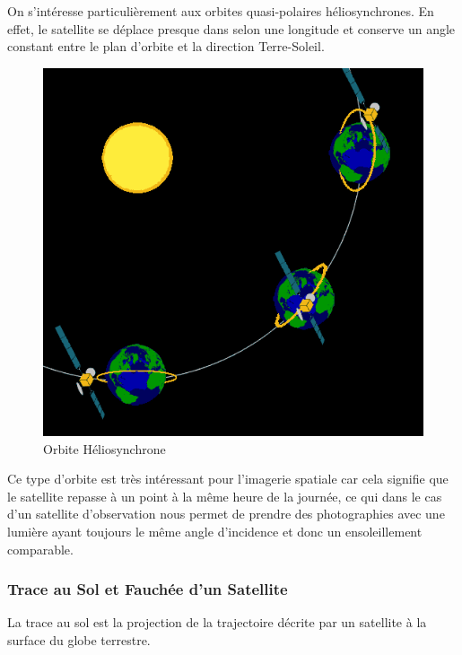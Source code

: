 \documentclass[a4paper, 10pt]{report}
\begin{document}
On s'intéresse particulièrement aux orbites quasi-polaires héliosynchrones. En effet, le satellite se déplace presque dans selon une longitude et conserve un angle constant entre le plan d'orbite et la direction Terre-Soleil.
\begin{figure}[H]
	\begin{center}
		\includegraphics[scale=0.3]{Images/Orbite_Heliosynchrone.png}
		\caption{Orbite Héliosynchrone}
	\end{center}
\end{figure}
Ce type d'orbite est très intéressant pour l'imagerie spatiale car cela signifie que le satellite repasse à un point à la même heure de la journée, ce qui dans le cas d'un satellite d'observation nous permet de prendre des photographies avec une lumière ayant toujours le même angle d'incidence et donc un ensoleillement comparable.
\subsubsection{Trace au Sol et Fauchée d'un Satellite}
La trace au sol est la projection de la trajectoire décrite par un satellite à la surface du globe terrestre.
\end{document}
